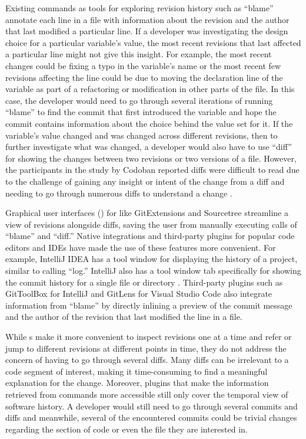 Existing  commands as tools for exploring revision history such as ``blame'' \cite{gitblame} annotate each line in a file with information about the revision and the author that last modified a particular line.
If a developer was investigating the design choice for a particular variable's value, the most recent revisions that last affected a particular line might not give this insight.
For example, the most recent changes could be fixing a typo in the variable's name or the most recent few revisions affecting the line could be due to moving the declaration line of the variable as part of a refactoring or modification in other parts of the file.
In this case, the developer would need to go through several iterations of running ``blame'' to find the commit that first introduced the variable and hope the commit contains information about the choice behind the value set for it.
If the variable's value changed and was changed across different revisions, then to further investigate what was changed, a developer would also have to use  ``diff'' \cite{gitdiff} for showing the changes between two revisions or two versions of a file.
However, the participants in the study by Codoban \etal reported diffs were difficult to read due to the challenge of gaining any insight or intent of the change from a diff and needing to go through numerous diffs to understand a change \cite{codoban_software_2015}.

Graphical user interfaces () for  like GitExtensions \cite{gitextensions} and Sourcetree \cite{sourcetree} streamline a view of revisions alongside diffs, saving the user from manually executing calls of  ``blame'' and ``diff.'' 
Native  integrations and third-party plugins for popular code editors and IDEs have made the use of these  features more convenient. 
For example, IntelliJ IDEA \cite{intellij} has a tool window for displaying the  history of a project, similar to calling  ``log.''
IntelliJ also has a tool window tab specifically for showing the commit history for a single file or directory \cite{intellij-showhistory}.
Third-party plugins such as GitToolBox \cite{gittoolbox} for IntelliJ and GitLens \cite{gitlens} for Visual Studio Code also integrate information from  ``blame'' by directly inlining a preview of the commit message and the author of the revision that last modified the line in a file.

While s make it more convenient to inspect revisions one at a time and refer or jump to different revisions at different points in time, they do not address the concern of having to go through several diffs. Many diffs can be irrelevant to a code segment of interest, making it time-consuming to find a meaningful explanation for the change.
Moreover, plugins that make the information retrieved from  commands more accessible still only cover the temporal view of software history.
A developer would still need to go through several commits and diffs and meanwhile, several of the encountered commits could be trivial changes regarding the section of code or even the file they are interested in.

